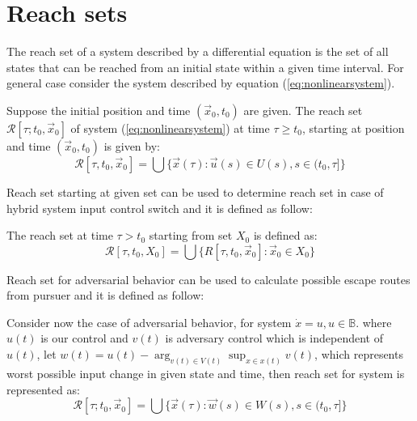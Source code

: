 \section{Reach sets}\label{s:ReachSets}
\noindent
The reach set of a system described by a differential equation is the
set of all states that can be reached from an initial state within a given time
interval.
\noindent For general case consider the system described by equation (\ref{eq:nonlinearsystem}).

\begin{definition}\label{def:reachset01}
Suppose the initial position
and time $(\vec{x}_0, t_0)$ are given. The reach set $\mathscr{R}[\tau; t_0, \vec{x}_0]$ of system (\ref{eq:nonlinearsystem}) at time $\tau \ge t_0$, starting at position and time $(\vec{x}_0, t_0)$ is given by:
\begin{equation}\label{eq:basicReachSetDefinition}
    \mathscr{R}[\tau, t_0, \vec{x}_0] = \bigcup \{\vec{x}(\tau):\vec{u}(s)\in U(s),s \in (t_0,\tau]\}
\end{equation}
\end{definition}
\noindent Reach set starting at given set can be used to determine reach set in case of hybrid system input control switch and it is defined as follow:
\begin{definition}
The reach set at time $\tau > t_0$ starting from set $X_0$ is defined as:
\begin{equation}
    \mathscr{R}[\tau, t_0, X_0] = \bigcup \{R[\tau, t_0, \vec{x}_0]:\vec{x}_0 \in X_0\}
\end{equation}
\end{definition}

\noindent Reach set for adversarial behavior can be used to calculate possible escape routes from pursuer and it is defined as follow:
\begin{definition}
Consider now the case of adversarial behavior, for system $\dot{x}=u,u\in \mathbb{B}$.
where $u(t)$ is our control and $v(t)$ is adversary control which is independent of $u(t)$, let $w(t)=u(t)- \arg_{v(t)\in V(t)}\sup_{{x} \in x(t)} v(t)$, which represents worst possible input change in given state and time, then reach set for system is represented as:
\begin{equation}
    \mathscr{R}[\tau; t_0, \vec{x}_0] = \bigcup \{\vec{x}(\tau):\vec{w}(s) \in W(s),s \in (t_0,\tau]\}
\end{equation}

\end{definition}

